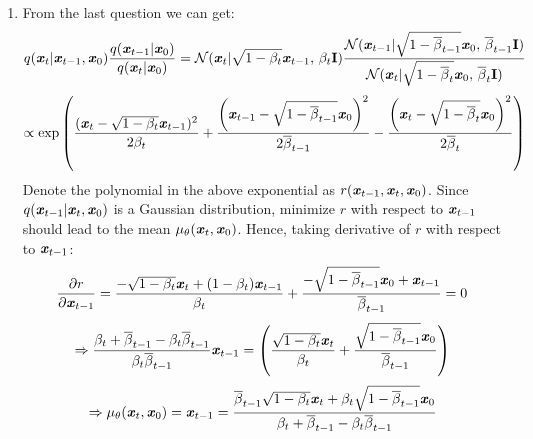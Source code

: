 \documentclass[12pt]{article}
\begin{document}
\begin{enumerate}
    \item From the last question we can get:
    \[q(\textbf{\textit{x}}_t|\textbf{\textit{x}}_{t-1},\textbf{\textit{x}}_0)\frac{q(\textbf{\textit{x}}_{t-1}|\textbf{\textit{x}}_0)}{q(\textbf{\textit{x}}_t|\textbf{\textit{x}}_0)} = \mathcal{N}(\textbf{\textit{x}}_t | \sqrt{1-\beta_t}\textbf{\textit{x}}_{t-1},\,\beta_t\mathbf{I})\frac{\mathcal{N}(\textbf{\textit{x}}_{t-1} | \sqrt{1-\overline{\beta}_{t-1}}\textbf{\textit{x}}_0,\,\overline{\beta}_{t-1}\mathbf{I})}{\mathcal{N}(\textbf{\textit{x}}_t | \sqrt{1-\overline{\beta}_t}\textbf{\textit{x}}_0,\,\overline{\beta}_t\mathbf{I})}\]
    \[\propto\exp\left(\frac{(\textbf{\textit{x}}_t - \sqrt{1-\beta_t}\textbf{\textit{x}}_{t-1})^2}{2\beta_t} + \frac{\left(\textbf{\textit{x}}_{t-1} - \sqrt{1-\overline{\beta}_{t-1}}\textbf{\textit{x}}_0\right)^2}{2\overline{\beta}_{t-1}} - \frac{\left(\textbf{\textit{x}}_{t} - \sqrt{1-\overline{\beta}_{t}}\textbf{\textit{x}}_0\right)^2}{2\overline{\beta}_{t}}\right)\]
    Denote the polynomial in the above exponential as $r(\textbf{\textit{x}}_{t-1}, \textbf{\textit{x}}_t, \textbf{\textit{x}}_0)$. Since $q(\textbf{\textit{x}}_{t-1}|\textbf{\textit{x}}_t,\textbf{\textit{x}}_0)$ is a Gaussian distribution, minimize $r$ with respect to $\textbf{\textit{x}}_{t-1}$ should lead to the mean $\mu_\theta(\textbf{\textit{x}}_t,\textbf{\textit{x}}_0)$. Hence, taking derivative of $r$ with respect to $\textbf{\textit{x}}_{t-1}$:
    \[\frac{\partial r}{\partial \textbf{\textit{x}}_{t-1}} = \frac{-\sqrt{1-\beta_t}\textbf{\textit{x}}_t + (1-\beta_t)\textbf{\textit{x}}_{t-1}}{\beta_t} + \frac{-\sqrt{1-\overline{\beta}_{t-1}}\textbf{\textit{x}}_{0} + \textbf{\textit{x}}_{t-1}}{\overline{\beta}_{t-1}} = 0\]
    \[\Rightarrow \frac{\beta_t+\overline{\beta}_{t-1}-\beta_t\overline{\beta}_{t-1}}{\beta_t\overline{\beta}_{t-1}}\textbf{\textit{x}}_{t-1} = \left(\frac{\sqrt{1-\beta_t}\textbf{\textit{x}}_t}{\beta_t} + \frac{\sqrt{1-\overline{\beta}_{t-1}}\textbf{\textit{x}}_0}{\overline{\beta}_{t-1}}\right)\]
    \[\Rightarrow \mu_\theta(\textbf{\textit{x}}_t,\textbf{\textit{x}}_0) = \textbf{\textit{x}}_{t-1} = \frac{\overline{\beta}_{t-1}\sqrt{1-\beta_t}\textbf{\textit{x}}_t + \beta_t\sqrt{1-\overline{\beta}_{t-1}}\textbf{\textit{x}}_0}{\beta_t+\overline{\beta}_{t-1}-\beta_t\overline{\beta}_{t-1}}\]
    \newpage


\end{enumerate}
\end{document}
